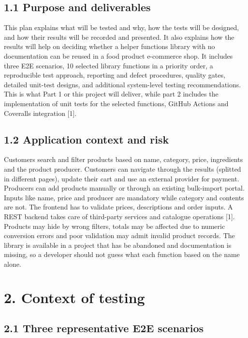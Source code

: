 \documentclass[
  9pt,
]{article}
\begin{document}
\subsection{1.1 Purpose and
deliverables}\label{purpose-and-deliverables}

This plan explains what will be tested and why, how the tests will be
designed, and how their results will be recorded and presented. It also
explains how the results will help on deciding whether a helper
functions library with no documentation can be reused in a food product
e-commerce shop. It includes three E2E scenarios, 10 selected library
functions in a priority order, a reproducible test approach, reporting
and defect procedures, quality gates, detailed unit-test designs, and
additional system-level testing recommendations. This is what Part 1 or
this project will deliver, while part 2 includes the implementation of
unit tests for the selected functions, GitHub Actions and Coveralls
integration {[}1{]}.

\subsection{1.2 Application context and
risk}\label{application-context-and-risk}

Customers search and filter products based on name, category, price,
ingredients and the product producer. Customers can navigate through the
results (splitted in different pages), update their cart and use an
external provider for payment. Producers can add products manually or
through an existing bulk-import portal. Inputs like name, price and
producer are mandatory while category and contents are not. The frontend
has to validate prices, descriptions and order inputs. A REST backend
takes care of third-party services and catalogue operations {[}1{]}.
Products may hide by wrong filters, totals may be affected due to
numeric conversion errors and poor validation may admit invalid product
records. The library is available in a project that has be abandoned and
documentation is missing, so a developer should not guess what each
function based on the name alone.

\section{2. Context of testing}\label{context-of-testing}

\subsection{2.1 Three representative E2E
scenarios}\label{three-representative-e2e-scenarios}
\end{document}
